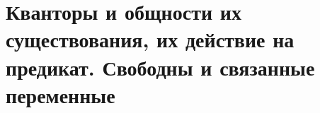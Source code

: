 \section{Кванторы и общности их существования, их действие на предикат. Свободны и связанные переменные}